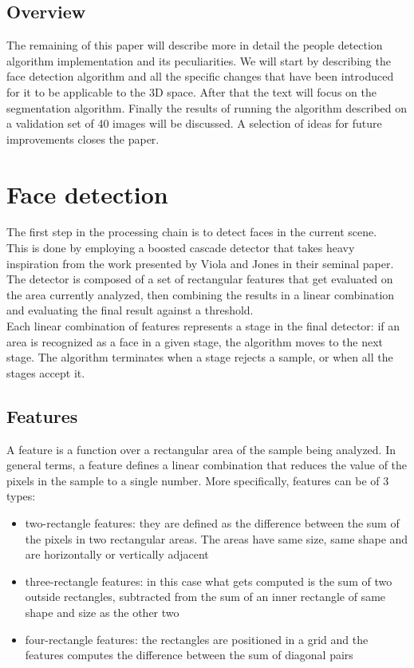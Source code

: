 \documentclass[a4paper,12pt,titlepage]{article}
\begin{document}
\subsection*{Overview}
The remaining of this paper will describe more in detail the people detection
algorithm implementation and its peculiarities. We will start by describing the
face detection algorithm and all the specific changes that have been introduced
for it to be applicable to the 3D space. After that the text will focus on the
segmentation algorithm. Finally the results of running the algorithm described
on a validation set of 40 images will be discussed. A selection of ideas for
future improvements closes the paper.

\section{Face detection}
The first step in the processing chain is to detect faces in the current scene.  \\
This is done by employing a boosted cascade detector that takes heavy
inspiration from the work presented by Viola and Jones in their seminal paper.  \\
The detector is composed of a set of rectangular features that get evaluated on
the area currently analyzed, then combining the results in a linear combination
and evaluating the final result against a threshold. \\
Each linear combination of features represents a stage in the final detector: if
an area is recognized as a face in a given stage, the algorithm moves to the
next stage. The algorithm terminates when a stage rejects a sample, or when all
the stages accept it.

\subsection{Features}
A feature is a function over a rectangular area of the sample being analyzed. In
general terms, a feature defines a linear combination that reduces the value of
the pixels in the sample to a single number. More specifically, features can be
of 3 types:

\begin{itemize}
  \item two-rectangle features: they are defined as the difference between the sum of
  the pixels in two rectangular areas. The areas have same size, same shape and
  are horizontally or vertically adjacent
  \item three-rectangle features: in this case what gets computed is the sum of two
  outside rectangles, subtracted from the sum of an inner rectangle of same
  shape and size as the other two
  \item four-rectangle features: the rectangles are positioned in a grid and the
  features computes the difference between the sum of diagonal pairs
\end{itemize}
\end{document}
